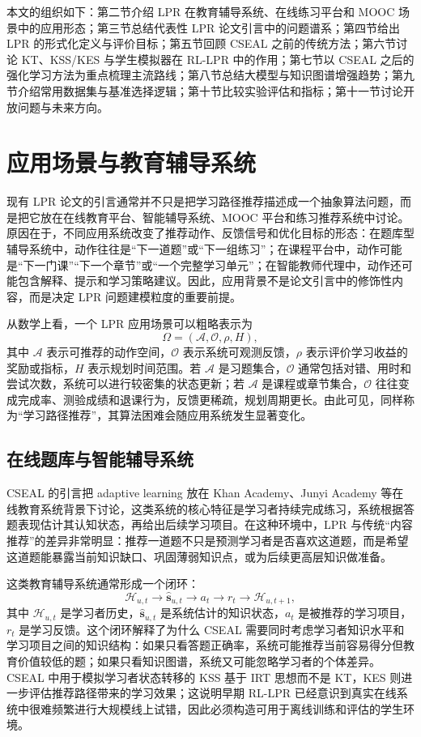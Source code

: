 \documentclass[UTF8,a4paper,zihao=-4]{ctexart}
\begin{document}
本文的组织如下：第二节介绍 LPR 在教育辅导系统、在线练习平台和 MOOC 场景中的应用形态；第三节总结代表性 LPR 论文引言中的问题谱系；第四节给出 LPR 的形式化定义与评价目标；第五节回顾 CSEAL 之前的传统方法；第六节讨论 KT、KSS/KES 与学生模拟器在 RL-LPR 中的作用；第七节以 CSEAL 之后的强化学习方法为重点梳理主流路线；第八节总结大模型与知识图谱增强趋势；第九节介绍常用数据集与基准选择逻辑；第十节比较实验评估和指标；第十一节讨论开放问题与未来方向。

\section{应用场景与教育辅导系统}

现有 LPR 论文的引言通常并不只是把学习路径推荐描述成一个抽象算法问题，而是把它放在在线教育平台、智能辅导系统、MOOC 平台和练习推荐系统中讨论。原因在于，不同应用系统改变了推荐动作、反馈信号和优化目标的形态：在题库型辅导系统中，动作往往是“下一道题”或“下一组练习”；在课程平台中，动作可能是“下一门课”“下一个章节”或“一个完整学习单元”；在智能教师代理中，动作还可能包含解释、提示和学习策略建议。因此，应用背景不是论文引言中的修饰性内容，而是决定 LPR 问题建模粒度的重要前提。

从数学上看，一个 LPR 应用场景可以粗略表示为
\begin{equation}
\Omega=(\mathcal{A},\mathcal{O},\rho,H),
\end{equation}
其中 $\mathcal{A}$ 表示可推荐的动作空间，$\mathcal{O}$ 表示系统可观测反馈，$\rho$ 表示评价学习收益的奖励或指标，$H$ 表示规划时间范围。若 $\mathcal{A}$ 是习题集合，$\mathcal{O}$ 通常包括对错、用时和尝试次数，系统可以进行较密集的状态更新；若 $\mathcal{A}$ 是课程或章节集合，$\mathcal{O}$ 往往变成完成率、测验成绩和退课行为，反馈更稀疏，规划周期更长。由此可见，同样称为“学习路径推荐”，其算法困难会随应用系统发生显著变化。

\subsection{在线题库与智能辅导系统}

CSEAL 的引言把 adaptive learning 放在 Khan Academy、Junyi Academy 等在线教育系统背景下讨论，这类系统的核心特征是学习者持续完成练习，系统根据答题表现估计其认知状态，再给出后续学习项目\cite{Liu2019CSEAL}。在这种环境中，LPR 与传统“内容推荐”的差异非常明显：推荐一道题不只是预测学习者是否喜欢这道题，而是希望这道题能暴露当前知识缺口、巩固薄弱知识点，或为后续更高层知识做准备。

这类教育辅导系统通常形成一个闭环：
\begin{equation}
\mathcal{H}_{u,t}\rightarrow \hat{\mathbf{s}}_{u,t}\rightarrow a_t\rightarrow r_t\rightarrow \mathcal{H}_{u,t+1},
\end{equation}
其中 $\mathcal{H}_{u,t}$ 是学习者历史，$\hat{\mathbf{s}}_{u,t}$ 是系统估计的知识状态，$a_t$ 是被推荐的学习项目，$r_t$ 是学习反馈。这个闭环解释了为什么 CSEAL 需要同时考虑学习者知识水平和学习项目之间的知识结构：如果只看答题正确率，系统可能推荐当前容易得分但教育价值较低的题；如果只看知识图谱，系统又可能忽略学习者的个体差异。CSEAL 中用于模拟学习者状态转移的 KSS 基于 IRT 思想而不是 KT，KES 则进一步评估推荐路径带来的学习效果；这说明早期 RL-LPR 已经意识到真实在线系统中很难频繁进行大规模线上试错，因此必须构造可用于离线训练和评估的学生环境\cite{Liu2019CSEAL}。
\end{document}
